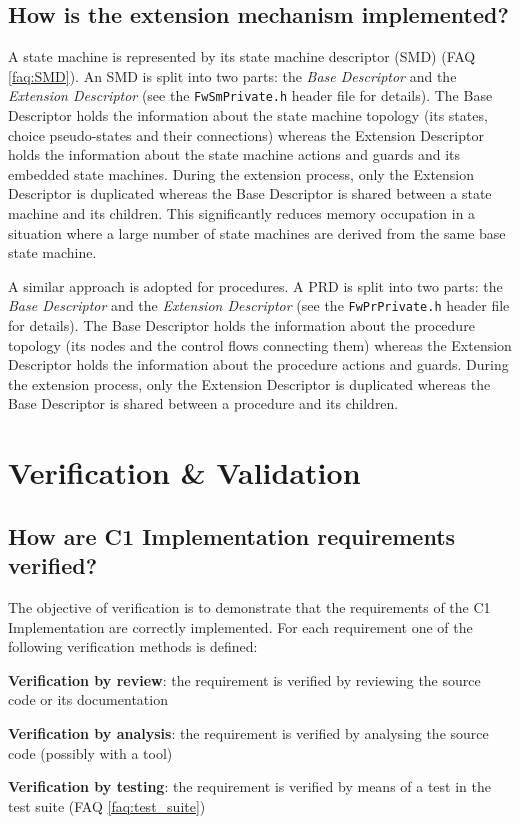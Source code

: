 \documentclass[faq]{../fwprofile}
\begin{document}
\subsection{How is the extension mechanism implemented?}\label{faq:SM_Extension_Impl}
A state machine is represented by its state machine descriptor (SMD) (FAQ \ref{faq:SMD}). An SMD is split into two parts: the \emph{Base Descriptor} and 
the \emph{Extension Descriptor} (see the \texttt{FwSmPrivate.h} header file for details). The Base Descriptor holds the information about 
the state machine topology (its states, choice pseudo-states and their connections) whereas the Extension Descriptor holds the information 
about the state machine actions and guards and its embedded state machines. During the extension process, only the Extension Descriptor 
is duplicated whereas the Base Descriptor is shared between a state machine and its children. This significantly reduces memory occupation 
in a situation where a large number of state machines are derived from the same base state machine. 

A similar approach is adopted for procedures. A PRD is split into two parts: the \emph{Base Descriptor} and the \emph{Extension Descriptor} 
(see the \texttt{FwPrPrivate.h} header file for details). The Base Descriptor holds the information about the procedure topology (its nodes and 
the control flows connecting them) whereas the Extension Descriptor holds the information about the procedure actions and guards. 
During the extension process, only the Extension Descriptor is duplicated whereas the Base Descriptor is shared between a procedure and its children.

\section{Verification \& Validation}

\subsection{How are C1 Implementation requirements verified?}
The objective of verification is to demonstrate that the requirements of the C1 Implementation are correctly implemented. For each requirement 
one of the following verification methods is defined:

\begin{fw_itemize} 
\item \textbf{Verification by review}: the requirement is verified by reviewing the source code or its documentation
\item \textbf{Verification by analysis}: the requirement is verified by analysing the source code (possibly with a tool)
\item \textbf{Verification by testing}: the requirement is verified by means of a test in the test suite (FAQ \ref{faq:test_suite})
\end{fw_itemize}
\end{document}
